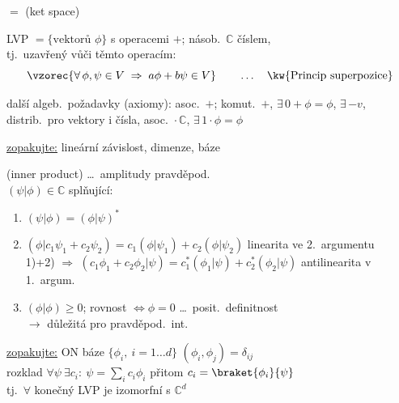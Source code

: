 \documentclass[11pt,a4paper]{article}
\begin{document}
 $=$  (ket space)

\begin{definice}[LVP]
LVP $= \{\text{vektorů } \phi\}$ s operacemi $+$; násob.\ $\mathbb{C}$ číslem, \\
tj.\ uzavřený vůči těmto operacím:
\[
  \vzorec{\forall\, \phi,\psi\in V \;\Rightarrow\; a\phi + b\psi \in V}
  \qquad\dots\quad \text{\kw{Princip superpozice}}
\]
\end{definice}

další algeb.\ požadavky (axiomy): asoc.\ $+$; komut.\ $+$, $\exists\, 0 + \phi = \phi$, $\exists\, {-v}$, \\
distrib.\ pro vektory i čísla, asoc.\ $\cdot\,\mathbb{C}$, $\exists\, 1\cdot\phi = \phi$

\underline{zopakujte:} lineární závislost, dimenze, báze

\begin{definice}
 (inner product) \dots\ amplitudy pravděpod. \\
\quad $(\psi|\phi) \in \mathbb{C}$ \quad splňující:
\begin{enumerate}[label=\arabic*)]
  \item $(\psi|\phi) = (\phi|\psi)^*$
  \item $(\phi|c_1\psi_1 + c_2\psi_2) = c_1(\phi|\psi_1) + c_2(\phi|\psi_2)$ \hfill linearita ve 2.\ argumentu \\
        1)+2) $\Rightarrow$ \quad $(c_1\phi_1 + c_2\phi_2|\psi) = c_1^*(\phi_1|\psi) + c_2^*(\phi_2|\psi)$ \hfill antilinearita v 1.\ argum.
  \item $(\phi|\phi) \geq 0$; \quad rovnost $\Leftrightarrow \phi = 0$ \hfill \dots\ posit.\ definitnost \\
         \hfill $\to$ důležitá pro pravděpod.\ int.
\end{enumerate}
\end{definice}

\underline{zopakujte:} ON báze \quad $\{\phi_i,\ i = 1\dots d\}$ \qquad $(\phi_i,\phi_j) = \delta_{ij}$ \\
\quad rozklad \quad $\forall\psi\ \exists c_i:\ \psi = \sum_i c_i\phi_i$ \quad přitom $c_i = \braket{\phi_i}{\psi}$ \\
\quad tj.\ $\forall$ konečný LVP je izomorfní s $\mathbb{C}^d$ \\
\quad {}
\end{document}
